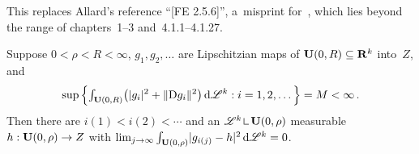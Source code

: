 \begin{remark}
    \label{rem:weyl}
    This replaces Allard's reference ``[FE 2.5.6]'', a~misprint for~\cite[5.2.6]{Federer1969},
    which lies beyond the range of chapters~1--3 and~4.1.1--4.1.27.
\end{remark}

\begin{lemma}[new]
    \label{new:rellich}
    Suppose $0 < \rho < R < \infty$, $g_1, g_2, \ldots$ are Lipschitzian maps of $\mathbf{U}(0,R)
    \subseteq \mathbf{R}^{k}$ into~$Z$, and
    \begin{displaymath}
        \sup \Big\{ {\textstyle\int_{\mathbf{U}(0,R)}^{}} \big( |g_i|^2 + \|\mathrm{D} g_i\|^2 \big) \,\mathrm{d} \mathscr{L}^{k} :
        i = 1, 2, \ldots \Big\} = M < \infty \,.
    \end{displaymath}
    Then there are $i(1) < i(2) < \cdots$ and an $\LM^{\vdim} \restrict \oball{0}{\rho}$
    measurable $h : \mathbf{U}(0,\rho) \to Z$ with $\lim_{j \to \infty} {\textstyle\int_{\mathbf{U}(0,\rho)}^{}}
    |g_{i(j)} - h|^2 \,\mathrm{d} \mathscr{L}^{k} = 0$.
\end{lemma}

